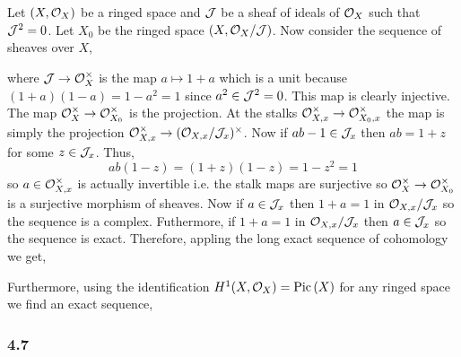 \documentclass[12pt]{article}
\begin{document}
Let $(X, \mathcal{O}_{X})$ be a ringed space and $\mathcal{J}$ be a sheaf of ideals of $\mathcal{O}_{X}$ such that $\mathcal{J}^2 = 0$. Let $X_0$ be the ringed space $(X, \mathcal{O}_{X} / \mathcal{J})$. Now consider the sequence of sheaves over $X$,
\begin{center}
\end{center}
where $\mathcal{J} \to \mathcal{O}_{X}^\times$ is the map $a \mapsto 1 + a$ which is a unit because $(1 + a)(1 - a) = 1 - a^2 = 1$ since $a^2 \in \mathcal{J}^2 = 0$. This map is clearly injective. The map $\mathcal{O}_{X}^\times \to \mathcal{O}_{X_0}^\times$ is the projection. At the stalks $\mathcal{O}_{X, x}^\times \to \mathcal{O}_{X_0, x}^\times$ the map is simply the projection $\mathcal{O}_{X, x}^\times \to (\mathcal{O}_{X, x} / \mathcal{J}_x)^\times$. Now if $ab - 1 \in \mathcal{J}_x$ then $ab = 1 + z$ for some $z \in \mathcal{J}_x$. Thus,
\[ ab(1 - z) = (1 + z)(1 - z) = 1 - z^2 = 1 \]
so $a \in \mathcal{O}_{X, x}^\times$ is actually invertible i.e. the stalk maps are surjective so $\mathcal{O}_{X}^\times \to \mathcal{O}_{X_0}^\times$ is a surjective morphism of sheaves. Now if $a \in \mathcal{J}_x$ then $1 + a = 1$ in $\mathcal{O}_{X, x} / \mathcal{J}_x$ so the sequence is a complex. Futhermore, if $1 + a = 1$ in $\mathcal{O}_{X, x} / \mathcal{J}_x$ then $a \in \mathcal{J}_x$ so the sequence is exact. Therefore, appling the long exact sequence of cohomology we get,
\begin{center}
\end{center}
Furthermore, using the identification $H^1(X, \mathcal{O}_{X}) = \mathrm{Pic} \left( X \right)$ for any ringed space we find an exact sequence,
\begin{center}
\end{center}

\subsubsection{4.7}
\end{document}
